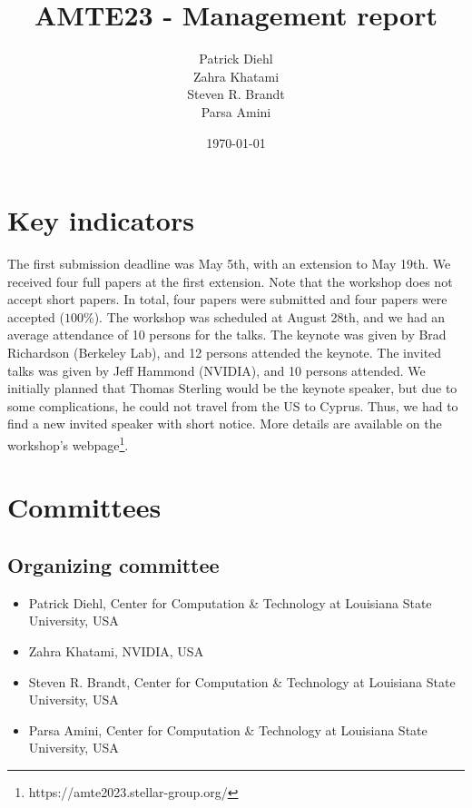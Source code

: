 \documentclass{article}
\title{AMTE23 - Management report}
\author{Patrick Diehl  \\ Zahra Khatami \\ Steven R. Brandt \\ Parsa Amini}
\date{\today}
\begin{document}
\maketitle

\section{Key indicators}
The first submission deadline was May 5th, with an extension to May 19th. We received four full papers at the first extension. Note that the workshop does not accept short papers. In total, four papers were submitted and four papers were accepted ($100$\%). The workshop was scheduled at August 28th, and we had an average attendance of 10 persons for the talks. The keynote was given by Brad Richardson (Berkeley Lab), and 12 persons attended the keynote. The invited talks was given by Jeff Hammond (NVIDIA), and 10 persons attended.
We initially planned that Thomas Sterling would be the keynote speaker, but due to some complications, he could not travel from the US to Cyprus. Thus, we had to find a new invited speaker with short notice.
More details are available on the workshop's webpage\footnote{https://amte2023.stellar-group.org/}.

\section{Committees}

\subsection{Organizing committee}
\label{sec:committee}

\begin{itemize}
    \item Patrick Diehl, Center for Computation \& Technology at Louisiana State University, USA
    \item Zahra Khatami, NVIDIA, USA
    \item Steven R. Brandt, Center for Computation \& Technology at Louisiana State University, USA
    \item Parsa Amini, Center for Computation \& Technology at Louisiana State University, USA
\end{itemize}


\end{document}
